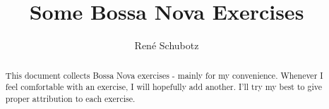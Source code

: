 \documentclass{article}
\title{Some Bossa Nova Exercises}
\author{Ren\'e Schubotz}
\begin{document}
\maketitle

\begin{abstract}
This document collects Bossa Nova exercises - mainly for my convenience.
Whenever I feel comfortable with an exercise, I will hopefully add another. 
I'll try my best to give proper attribution to each exercise.
\end{abstract}

\nopagebreak


\end{document}
